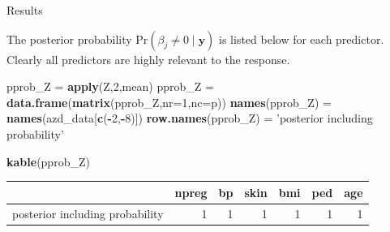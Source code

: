 \documentclass[ignorenonframetext,]{beamer}
\newenvironment{Shaded}{\begin{snugshade}}{\end{snugshade}}
\newcommand{\KeywordTok}[1]{\textcolor[rgb]{0.13,0.29,0.53}{\textbf{#1}}}
\newcommand{\DataTypeTok}[1]{\textcolor[rgb]{0.13,0.29,0.53}{#1}}
\newcommand{\DecValTok}[1]{\textcolor[rgb]{0.00,0.00,0.81}{#1}}
\newcommand{\StringTok}[1]{\textcolor[rgb]{0.31,0.60,0.02}{#1}}
\newcommand{\OperatorTok}[1]{\textcolor[rgb]{0.81,0.36,0.00}{\textbf{#1}}}
\newcommand{\NormalTok}[1]{#1}
\begin{document}
\begin{frame}[fragile]{Results}

The posterior probability
\(\mbox{Pr}(\beta_j \neq 0 \mid \boldsymbol{y})\) is listed below for
each predictor. Clearly all predictors are highly relevant to the
response.

\begin{Shaded}
\begin{Highlighting}[]
\NormalTok{pprob_Z =}\StringTok{ }\KeywordTok{apply}\NormalTok{(Z,}\DecValTok{2}\NormalTok{,mean)}
\NormalTok{pprob_Z =}\StringTok{ }\KeywordTok{data.frame}\NormalTok{(}\KeywordTok{matrix}\NormalTok{(pprob_Z,}\DataTypeTok{nr=}\DecValTok{1}\NormalTok{,}\DataTypeTok{nc=}\NormalTok{p))}
\KeywordTok{names}\NormalTok{(pprob_Z) =}\StringTok{ }\KeywordTok{names}\NormalTok{(azd_data[}\KeywordTok{c}\NormalTok{(}\OperatorTok{-}\DecValTok{2}\NormalTok{,}\OperatorTok{-}\DecValTok{8}\NormalTok{)])}
\KeywordTok{row.names}\NormalTok{(pprob_Z) =}\StringTok{ 'posterior including probability'}

\KeywordTok{kable}\NormalTok{(pprob_Z)}
\end{Highlighting}
\end{Shaded}

\begin{longtable}[]{@{}lrrrrrr@{}}
\toprule
& npreg & bp & skin & bmi & ped & age\tabularnewline
\midrule
\endhead
posterior including probability & 1 & 1 & 1 & 1 & 1 & 1\tabularnewline
\bottomrule
\end{longtable}

\end{frame}
\end{document}
